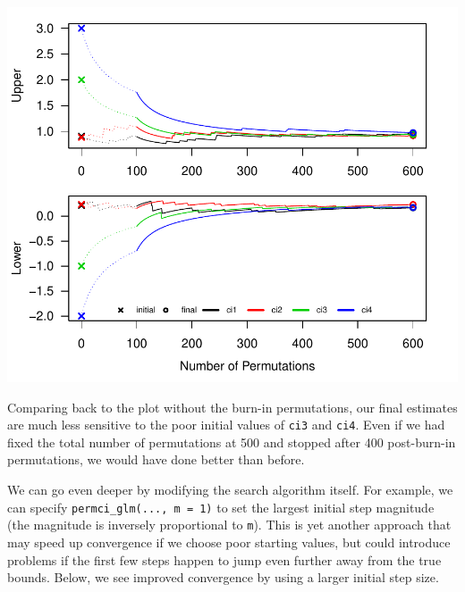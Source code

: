 \documentclass[12pt]{article}\usepackage[]{graphicx}\usepackage[]{color}
\makeatletter
\def\maxwidth{ %
  \ifdim\Gin@nat@width>\linewidth
    \linewidth
  \else
    \Gin@nat@width
  \fi
}
\newenvironment{knitrout}{}{} %
\makeatother
\begin{document}
\begin{knitrout}
\color{fgcolor}

{\centering \includegraphics[width=\maxwidth]{figure/ci_plots2-1} 

}



\end{knitrout}
\noindent Comparing back to the plot without the burn-in permutations, our final estimates are much less sensitive to the poor initial values of \texttt{ci3} and \texttt{ci4}. Even if we had fixed the total number of permutations at 500 and stopped after 400 post-burn-in permutations, we would have done better than before.

We can go even deeper by modifying the search algorithm itself. For example, we can specify \texttt{permci\_glm(..., m = 1)} to set the largest initial step magnitude (the magnitude is inversely proportional to \texttt{m}). This is yet another approach that may speed up convergence if we choose poor starting values, but could introduce problems if the first few steps happen to jump even further away from the true bounds. Below, we see improved convergence by using a larger initial step size.
\end{document}
